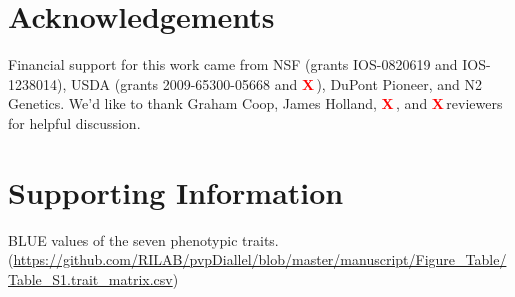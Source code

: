 \documentclass[9pt,twocolumn,twoside]{gsajnl}
\newcommand{\beginsupplement}{%
        \setcounter{table}{0}
        \renewcommand{\thetable}{S\arabic{table}}%
        \setcounter{figure}{0}
        \renewcommand{\thefigure}{S\arabic{figure}}%
     }
\newcommand{\X}{\textcolor{red}{\bf X\,}}
\begin{document}


\section*{Acknowledgements}
Financial support for this work came from NSF (grants IOS-0820619 and IOS-1238014), USDA (grants 2009-65300-05668 and \X), DuPont Pioneer, and N2 Genetics. We'd like to thank Graham Coop, James Holland, \X, and \X reviewers for helpful discussion. 


\clearpage




\onecolumn
\pagebreak
\beginsupplement

\section*{Supporting Information}

\begin{table}[]
\caption{BLUE values of the seven phenotypic traits. (\url{https://github.com/RILAB/pvpDiallel/blob/master/manuscript/Figure_Table/Table_S1.trait_matrix.csv})}
\label{table:table_s1}
\end{table}
\end{document}
